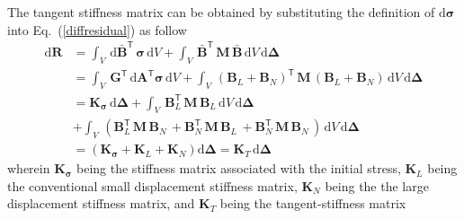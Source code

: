The tangent stiffness matrix can be obtained by substituting the definition of $\mathrm{d} \boldsymbol{\sigma}$ into Eq.~(\ref{diffresidual}) as follow
\begin{equation}
\begin{aligned}
\mathrm{d} \mathbf{R} & = \int_{V} \, \mathrm{d} \bar{\mathbf{B}}^{\mathsf{T}} \, \boldsymbol{\sigma} \, \mathrm{d} V + \int_{V} \, \bar{\mathbf{B}}^{\mathsf{T}} \, \mathbf{M} \, \bar{\mathbf{B}} \, \mathrm{d} V \, \mathrm{d} \boldsymbol{\Delta} \\ 
& = \int_{V} \, \mathbf{G}^{\mathsf{T}} \, \mathrm{d} \mathbf{A}^{\mathsf{T}} \boldsymbol{\sigma} \, \mathrm{d} V + \int_{V} \, \left(\mathbf{B}_L + \mathbf{B}_N \right)^{\mathsf{T}} \, \mathbf{M} \,  \left(\mathbf{B}_L + \mathbf{B}_N \right) \, \mathrm{d} V \, \mathrm{d} \boldsymbol{\Delta} \\ 
& = \mathbf{K}_{\boldsymbol{\sigma}} \, \mathrm{d} \boldsymbol{\Delta} + \int_{V} \, \mathbf{B}_L^{\mathsf{T}} \, \mathbf{M} \, \mathbf{B}_L \, \mathrm{d} V \, \mathrm{d} \boldsymbol{\Delta}\\ 
& + \int_{V} \,  \left(\mathbf{B}_L^{\mathsf{T}} \, \mathbf{M} \, \mathbf{B}_N \, + \mathbf{B}_N^{\mathsf{T}} \, \mathbf{M} \, \mathbf{B}_L \, + \mathbf{B}_N^{\mathsf{T}} \, \mathbf{M} \, \mathbf{B}_N \,  \right) \, \mathrm{d} V \, \mathrm{d} \boldsymbol{\Delta}\\
& = \left(\mathbf{K}_{\boldsymbol{\sigma}} + \mathbf{K}_L + \mathbf{K}_N\right)\mathrm{d} \boldsymbol{\Delta} = \mathbf{K}_T \, \mathrm{d} \boldsymbol{\Delta}
\end{aligned} 
\end{equation} 
wherein $\mathbf{K}_{\boldsymbol{\sigma}}$ being the stiffness matrix associated with the initial stress, $\mathbf{K}_L$ being the conventional small displacement stiffness matrix, $\mathbf{K}_N$ being the the large displacement stiffness matrix, and $\mathbf{K}_T$ being the tangent-stiffness matrix 

